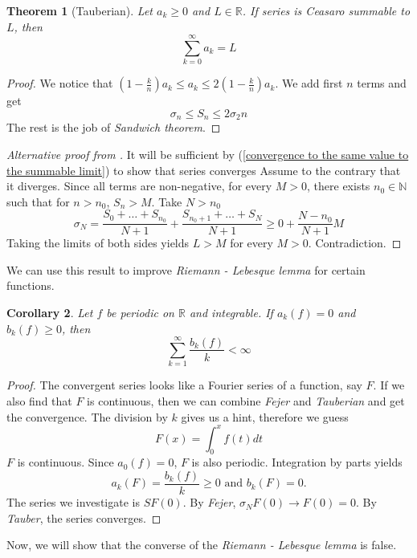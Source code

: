 \documentclass[12pt]{amsart}
\newtheorem{theorem}{Theorem}[section]
\newtheorem{corollary}[theorem]{Corollary}
\theoremstyle{definition}
\newcommand{\NN}{{\mathbb N}} %
\newcommand{\RR}{{\mathbb R}} %
\begin{document}
\begin{theorem}[Tauberian]
    Let $a_k \geq 0$ and $L \in \RR$. If series is Ceasaro summable to $L$, then
    \[
    \sum_{k=0}^{\infty} a_k = L
    \]
\end{theorem}


\begin{proof}
    We notice that  $(1-\frac{k}{n})a_k \leq a_k \leq 2(1-\frac{k}{n})a_k$. We add first $n$ terms and get
    \[
    \sigma_n \leq S_n \leq 2 \sigma_2n
    \]
    The rest is the job of \textit{Sandwich theorem}.
\end{proof}


\begin{proof}[Alternative proof from \cite{Wade}]
    It will be sufficient by (\ref{convergence to the same value to the summable limit}) to show that series converges Assume to the contrary that it diverges. Since all terms are non-negative, for every $M > 0$, there exists $n_0 \in \NN$ such that for $n > n_0$, $S_n > M$. Take $ N > n_0$
    \[
    \sigma_N = \frac{S_0 + \dots + S_{n_0}}{N+1} + \frac{S_{n_0 + 1} + \dots + S_{N}}{N+1} \geq 0 + \frac{N-n_0}{N+1}M
    \]
    Taking the limits of both sides yields $L > M$ for every $M > 0$. Contradiction.
\end{proof}


We can use this result to improve \emph{Riemann - Lebesque lemma} for certain functions.


\begin{corollary}
    Let $f$ be periodic on $\RR$ and integrable. If $a_k(f) = 0$ and $b_k(f) \geq 0$, then
    \[
    \sum_{k=1}^{\infty}\frac{b_k(f)}{k} < \infty
    \]
\end{corollary}


\begin{proof}
    The convergent series looks like a Fourier series of a function, say $F$. If we also find that $F$ is continuous, then we can combine \textit{Fejer} and \textit{Tauberian} and get the convergence. The division by $k$ gives us a hint, therefore we guess
    \[
    F(x) = \int_{0}^{x}f(t)dt
    \]
    $F$ is continuous. Since $a_0(f) = 0$,  $F$ is also periodic. Integration by parts yields
    \[
    a_k(F) = \frac{b_k(f)}{k} \geq 0 \text{ and } b_k(F) = 0.
    \]
    The series we investigate is $SF(0)$. By \emph{Fejer}, $\sigma_NF(0) \to F(0) = 0$. By \emph{Tauber}, the series converges.
\end{proof}


Now, we will show that the converse of the \emph{Riemann - Lebesque lemma} is false.
\end{document}
